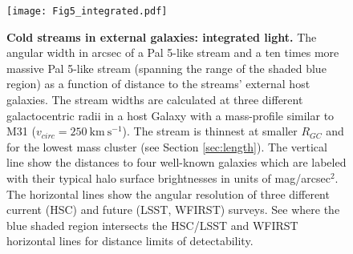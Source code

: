 \documentclass[twocolumn]{aastex62}
\newcommand{\kms}{\ensuremath{\textrm{km}~\textrm{s}^{-1}}}
\begin{document}








\begin{figure}
\centerline{\texttt{[image: Fig5\_integrated.pdf]}}
\caption{{\bf Cold streams in external galaxies: integrated light.} The angular width in arcsec of a Pal 5-like stream and a ten times more massive Pal 5-like stream (spanning the range of the shaded blue region) as a function of distance to the streams' external host galaxies. The stream widths are calculated at three different galactocentric radii in a host Galaxy with a mass-profile similar to M31 ($v_{circ} = 250 ~\kms$). The stream is thinnest at smaller $R_{GC}$ and for the lowest mass cluster (see Section \ref{sec:length}). The vertical line show the distances to four well-known galaxies which are labeled with their typical halo surface brightnesses in units of mag/arcsec$^2$. The horizontal lines show the angular resolution of three different current (HSC) and future (LSST, WFIRST) surveys. See where the blue shaded region intersects the HSC/LSST and WFIRST horizontal lines for distance limits of detectability.} %
\label{fig:int}
\end{figure}
\end{document}
